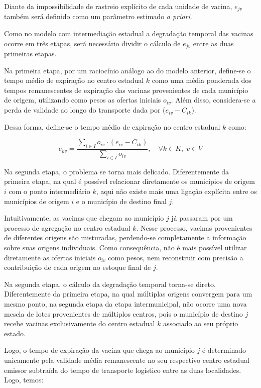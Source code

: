 Diante da impossibilidade de rastreio explícito de cada unidade de vacina, $e_{jv}$ também será definido como um parâmetro estimado \textit{a priori}.

Como no modelo com intermediação estadual a degradação temporal das vacinas ocorre em três etapas, será necessário dividir o cálculo de $e_{jv}$ entre as duas primeiras etapas.

Na primeira etapa, por um raciocínio análogo ao do modelo anterior, define-se o tempo médio de expiração no centro estadual $k$ como uma média ponderada dos tempos remanescentes de expiração das vacinas provenientes de cada município de origem, utilizando como pesos as ofertas iniciais $o_{iv}$. Além disso, considera-se a perda de validade ao longo do transporte dada por ($e_{iv} - C_{ik}$).

Dessa forma, define-se o tempo médio de expiração no centro estadual $k$ como:

\begin{equation*}
e_{kv} =
\frac{
\sum\limits_{i \in I} o_{iv} \cdot \left( e_{iv} - C_{ik} \right)
}{
\sum\limits_{i \in I} o_{iv}
},
\quad \forall k \in K,\; v \in V
\end{equation*}

Na segunda etapa, o problema se torna mais delicado. Diferentemente da primeira etapa, na qual é possível relacionar diretamente os municípios de origem $i$ com o ponto intermediário $k$, aqui não existe mais uma ligação explícita entre os municípios de origem $i$ e o município de destino final $j$.

Intuitivamente, as vacinas que chegam ao município $j$ já passaram por um processo de agregação no centro estadual $k$. Nesse processo, vacinas provenientes de diferentes origens são misturadas, perdendo-se completamente a informação sobre suas origens individuais. Como consequência, não é mais possível utilizar diretamente as ofertas iniciais $o_{iv}$ como pesos, nem reconstruir com precisão a contribuição de cada origem no estoque final de $j$.

Na segunda etapa, o cálculo da degradação temporal torna-se direto. Diferentemente da primeira etapa, na qual múltiplas origens convergem para um mesmo ponto, na segunda etapa da etapa intermunicipal, não ocorre uma nova mescla de lotes provenientes de múltiplos centros, pois o município de destino $j$ recebe vacinas exclusivamente do centro estadual $k$ associado ao seu próprio estado.

Logo, o tempo de expiração da vacina que chega ao município $j$ é determinado unicamente pela validade média remanescente no seu respectivo centro estadual emissor subtraída do tempo de transporte logístico entre as duas localidades. Logo, temos:

